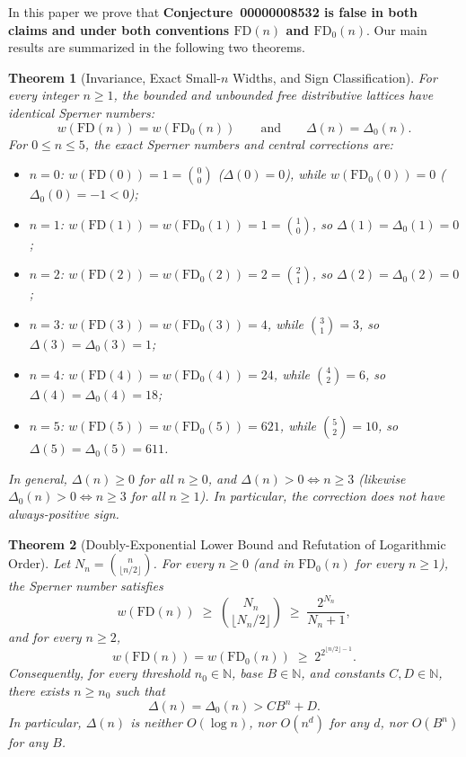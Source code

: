 \documentclass[11pt]{article}
\newtheorem{theorem}{Theorem}[section]
\theoremstyle{definition}
\newcommand{\FD}{\mathrm{FD}}
\newcommand{\FDz}{\mathrm{FD}_0}
\begin{document}
In this paper we prove that \textbf{Conjecture~00000008532 is false in both claims and under both conventions $\FD(n)$ and $\FDz(n)$}. Our main results are summarized in the following two theorems.

\begin{theorem}[Invariance, Exact Small-$n$ Widths, and Sign Classification]\label{thm:small-and-sign}
For every integer $n \ge 1$, the bounded and unbounded free distributive lattices have identical Sperner numbers:
\[
  w(\FD(n)) = w(\FDz(n)) \qquad \text{and} \qquad \Delta(n) = \Delta_0(n).
\]
For $0 \le n \le 5$, the exact Sperner numbers and central corrections are:
\begin{itemize}
  \item $n = 0$: $w(\FD(0)) = 1 = \binom{0}{0}$ ($\Delta(0) = 0$), while $w(\FDz(0)) = 0$ ($\Delta_0(0) = -1 < 0$);
  \item $n = 1$: $w(\FD(1)) = w(\FDz(1)) = 1 = \binom{1}{0}$, so $\Delta(1) = \Delta_0(1) = 0$;
  \item $n = 2$: $w(\FD(2)) = w(\FDz(2)) = 2 = \binom{2}{1}$, so $\Delta(2) = \Delta_0(2) = 0$;
  \item $n = 3$: $w(\FD(3)) = w(\FDz(3)) = 4$, while $\binom{3}{1} = 3$, so $\Delta(3) = \Delta_0(3) = 1$;
  \item $n = 4$: $w(\FD(4)) = w(\FDz(4)) = 24$, while $\binom{4}{2} = 6$, so $\Delta(4) = \Delta_0(4) = 18$;
  \item $n = 5$: $w(\FD(5)) = w(\FDz(5)) = 621$, while $\binom{5}{2} = 10$, so $\Delta(5) = \Delta_0(5) = 611$.
\end{itemize}
In general, $\Delta(n) \ge 0$ for all $n \ge 0$, and $\Delta(n) > 0 \iff n \ge 3$ (likewise $\Delta_0(n) > 0 \iff n \ge 3$ for all $n \ge 1$). In particular, the correction does \emph{not} have always-positive sign.
\end{theorem}

\begin{theorem}[Doubly-Exponential Lower Bound and Refutation of Logarithmic Order]\label{thm:double-exp}
Let $N_n = \binom{n}{\lfloor n/2 \rfloor}$. For every $n \ge 0$ (and in $\FDz(n)$ for every $n \ge 1$), the Sperner number satisfies
\begin{equation}\label{eq:iter-cb}
  w(\FD(n)) \;\ge\; \binom{N_n}{\lfloor N_n / 2 \rfloor} \;\ge\; \frac{2^{N_n}}{N_n + 1},
\end{equation}
and for every $n \ge 2$,
\begin{equation}\label{eq:clean-dexp}
  w(\FD(n)) = w(\FDz(n)) \;\ge\; 2^{2^{\lfloor n/2 \rfloor - 1}}.
\end{equation}
Consequently, for every threshold $n_0 \in \mathbb{N}$, base $B \in \mathbb{N}$, and constants $C, D \in \mathbb{N}$, there exists $n \ge n_0$ such that
\[
  \Delta(n) = \Delta_0(n) > C B^n + D.
\]
In particular, $\Delta(n)$ is neither $O(\log n)$, nor $O(n^d)$ for any $d$, nor $O(B^n)$ for any $B$.
\end{theorem}
\end{document}

